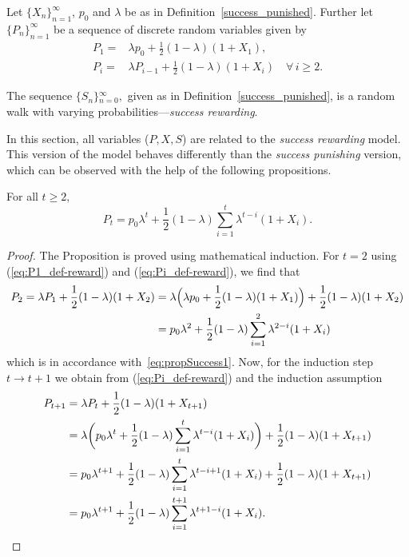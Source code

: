 \begin{definition}
\label{succes_rewarded}Let ${\{X_{n}\}}_{n=1}^{\infty}$, $p_{0}$
and $\lambda$ be as in Definition~\ref{success_punished}.
Further
let ${\{P_{n}\}}_{n=1}^{\infty}$ be a sequence of discrete random
variables given by
\begin{eqnarray}
P_{1}=&\lambda p_{0}+\frac{1}{2}(1-\lambda)(1+X_{1}),\label{eq:P1_def-reward}
\\
P_{i}=&\lambda P_{i-1}+\frac{1}{2}(1-\lambda)(1+X_{i})\quad\forall\, i\geq2.\label{eq:Pi_def-reward}
\end{eqnarray}

The sequence ${\{S_{n}\}}{}_{n=0}^{\infty},$ given as in Definition~\ref{success_punished}, is a random walk with varying probabilities---\emph{success rewarding}.
\end{definition}

In this section, all variables ($P,X,S$) are related to the
\emph{success rewarding} model.
This version of the model behaves differently
than the \emph{success punishing} version, which can be observed with
the help of the following propositions.

\begin{proposition}
For all $t\ge 2,$
\begin{equation}
P_{t}=p_{0}\lambda^{t}+\frac{1}{2}(1-\lambda)\sum_{i=1}^{t}\lambda^{t-i}(1+X_{i}).\label{eq:propSuccess1}
\end{equation}
\end{proposition}

\begin{proof}
The Proposition is proved using mathematical induction.
For $t=2$ using (\ref{eq:P1_def-reward})
and (\ref{eq:Pi_def-reward}), we find that
$$
\aligned
P_{2}=\lambda P_{1}+\frac{1}{2}(1-\lambda)(1+X_{2})&=\lambda\Big(\lambda p_{0}+\frac{1}{2}(1-\lambda)(1+X_{1})\Big)+\frac{1}{2}(1-\lambda)(1+X_{2})\\
&=p_{0}\lambda^{2}+\frac{1}{2}(1-\lambda)\sum_{i=1}^{2}\lambda^{2-i}(1+X_{i})
\endaligned
$$
which is in accordance with~\eqref{eq:propSuccess1}.
Now, for the
induction step $t\rightarrow t+1$ we obtain from (\ref{eq:Pi_def-reward})
and the induction assumption
$$
\aligned
P_{t+1}&=\lambda P_{t}+\frac{1}{2}(1-\lambda)(1+X_{t+1})\\
&=\lambda\bigg(p_{0}\lambda^{t}+\frac{1}{2}(1-\lambda)\sum_{i=1}^{t}\lambda^{t-i}(1+X_{i})\bigg)+\frac{1}{2}(1-\lambda)(1+X_{t+1})\\
&=p_{0}\lambda^{t+1}+\frac{1}{2}(1-\lambda)\sum_{i=1}^{t}\lambda^{t-i+1}(1+X_{i})+\frac{1}{2}(1-\lambda)(1+X_{t+1})\\
&=p_{0}\lambda^{t+1}+\frac{1}{2}(1-\lambda)\sum_{i=1}^{t+1}\lambda^{t+1-i}(1+X_{i}).
\endaligned
$$
\end{proof}


